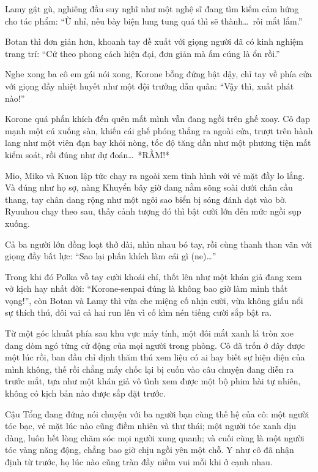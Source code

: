 \documentclass[../main.tex]{subfiles}
\begin{document}
Lamy gật gù, nghiêng đầu suy nghĩ như một nghệ sĩ đang tìm kiếm cảm hứng cho tác phẩm: ``Ừ nhỉ, nếu bày biện lung tung quá thì sẽ thành\dots\ rối mắt lắm.''

Botan thì đơn giản hơn, khoanh tay đề xuất với giọng người đã có kinh nghiệm trang trí: ``Cứ theo phong cách hiện đại, đơn giản mà ấm cúng là ổn rồi.''

Nghe xong ba cô em gái nói xong, Korone bỗng đứng bật dậy, chỉ tay về phía cửa với giọng đầy nhiệt huyết như một đội trưởng dẫn quân: ``Vậy thì, xuất phát nào!''

Korone quá phấn khích đến quên mất mình vẫn đang ngồi trên ghế xoay. Cô đạp mạnh một cú xuống sàn, khiến cái ghế phóng thẳng ra ngoài cửa, trượt trên hành lang như một viên đạn bay khỏi nòng, tốc độ tăng dần như một phương tiện mất kiểm soát, rồi đúng như dự đoán\dots\ *RẦM!*

Mio, Miko và Kuon lập tức chạy ra ngoài xem tình hình với vẻ mặt đầy lo lắng. Và đúng như họ sợ, nàng Khuyển bây giờ đang nằm sõng soài dưới chân cầu thang, tay chân dang rộng như một ngôi sao biển bị sóng đánh dạt vào bờ. Ryuuhou chạy theo sau, thấy cảnh tượng đó thì bật cười lớn đến mức ngồi sụp xuống.

Cả ba người lớn đồng loạt thở dài, nhìn nhau bó tay, rồi cùng thanh than vãn với giọng đầy bất lực: ``Sao lại phấn khích làm cái gì (ne)\dots''

Trong khi đó Polka vỗ tay cười khoái chí, thốt lên như một khán giả đang xem vở kịch hay nhất đời: ``Korone-senpai đúng là không bao giờ làm mình thất vọng!'', còn Botan và Lamy thì vừa che miệng cố nhịn cười, vừa không giấu nổi sự thích thú, đôi vai cả hai run lên vì cố kìm nén tiếng cười sắp bật ra.

\il

Từ một góc khuất phía sau khu vực máy tính, một đôi mắt xanh lá tròn xoe đang dòm ngó từng cử động của mọi người trong phòng. Cô đã trốn ở đây được một lúc rồi, ban đầu chỉ định thăm thú xem liệu có ai hay biết sự hiện diện của mình không, thế rồi chẳng mấy chốc lại bị cuốn vào câu chuyện đang diễn ra trước mắt, tựa như một khán giả vô tình xem được một bộ phim hài tự nhiên, không có kịch bản nào được sắp đặt trước.

Cậu Tổng đang đứng nói chuyện với ba người bạn cùng thế hệ của cô: một người tóc bạc, vẻ mặt lúc nào cũng điềm nhiên và thư thái; một người tóc xanh dịu dàng, luôn hết lòng chăm sóc mọi người xung quanh; và cuối cùng là một người tóc vàng năng động, chẳng bao giờ chịu ngồi yên một chỗ. Y như cô đã nhận định từ trước, họ lúc nào cũng tràn đầy niềm vui mỗi khi ở cạnh nhau.
\end{document}

